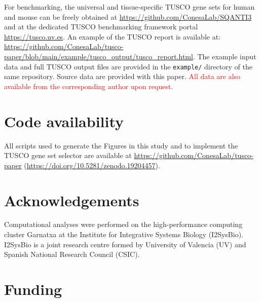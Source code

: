 \documentclass[pdflatex,sn-nature]{sn-jnl}%
\newcommand{\tuscoGeneSet}{TUSCO gene set}
\newcommand{\tuscoBenchmarkingFramework}{TUSCO benchmarking framework}
\begin{document}
For benchmarking, the universal and tissue-specific \tuscoGeneSet{}s for human and mouse can be freely obtained at \url{https://github.com/ConesaLab/SQANTI3} and at the dedicated \tuscoBenchmarkingFramework{} portal \url{https://tusco.uv.es}. An example of the TUSCO report is available at: \url{https://github.com/ConesaLab/tusco-paper/blob/main/example/tusco_output/tusco_report.html}. The example input data and full TUSCO output files are provided in the \texttt{example/} directory of the same repository. Source data are provided with this paper. \textcolor{red}{All data are also available from the corresponding author upon request.}


\section{Code availability}

All scripts used to generate the Figures in this study and to implement the \tuscoGeneSet{} selector are available at \url{https://github.com/ConesaLab/tusco-paper} (\url{https://doi.org/10.5281/zenodo.19204457}).


\backmatter




\section{Acknowledgements}

Computational analyses were performed on the high-performance computing cluster Garnatxa at the Institute for Integrative Systems Biology (I2SysBio). I2SysBio is a joint research centre formed by University of Valencia (UV) and Spanish National Research Council (CSIC).

\section{Funding}
\end{document}
